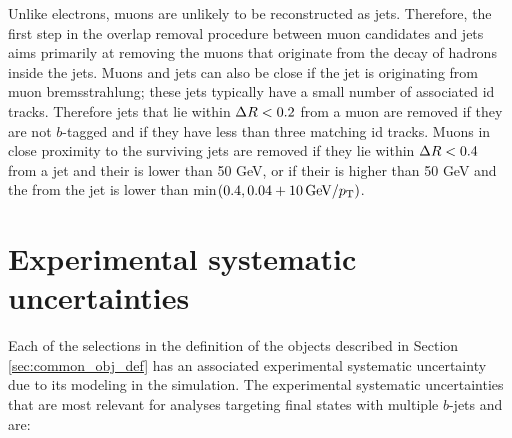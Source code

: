Unlike electrons, muons are unlikely to be reconstructed as jets. Therefore, the first step in the overlap removal procedure between muon candidates and jets 
aims primarily at removing the muons that originate from the decay of hadrons inside the jets. 
Muons and jets can also be close if the jet is originating from muon bremsstrahlung; these jets typically have a small number of associated \gls{id} tracks.
Therefore jets that lie within $\Delta R < 0.2$ from a muon are removed if they are not $b$-tagged and if they have less than three matching \gls{id} tracks. 
Muons in close proximity to the surviving jets are removed 
if they lie within $\Delta R<0.4$ from a jet and their \pt is lower than 50 GeV, or if their \pt is higher than 50 GeV and the \dR from the jet 
is lower than min$(0.4, 0.04 + 10 \, {\rm{GeV}}/p_{\rm T})$. 

\section{Experimental systematic uncertainties}
\label{sec:common_syst}

Each of the selections in the definition of the objects described in Section \ref{sec:common_obj_def} has an associated experimental systematic uncertainty due to its modeling in the simulation. 
The experimental systematic uncertainties that are most relevant for analyses targeting final states with multiple $b$-jets and \met are:

